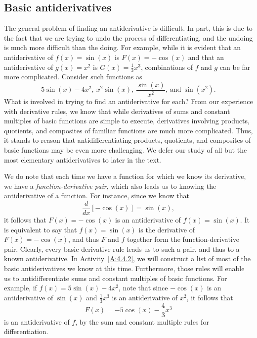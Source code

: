 

\subsection*{Basic antiderivatives}

The general problem of finding an antiderivative is difficult.  In part, this is due to the fact that we are trying to undo the process of differentiating, and the undoing is much more difficult than the doing.  For example, while it is evident that an antiderivative of $f(x) = \sin(x)$ is $F(x) = -\cos(x)$ and that an antiderivative of $g(x) = x^2$ is $G(x) = \frac{1}{3} x^3$, combinations of $f$ and $g$ can be far more complicated.  Consider such functions as
$$5\sin(x) - 4x^2, \ x^2 \sin(x), \ \frac{\sin(x)}{x^2}, \ \mbox{and} \ \sin(x^2).$$
What is involved in trying to find an antiderivative for each?  From our experience with derivative rules, we know that while derivatives of sums and constant multiples of  basic functions are simple to execute, derivatives involving products, quotients, and composites of familiar functions are much more complicated.  Thus, it stands to reason that antidifferentiating products, quotients, and composites of basic functions may be even more challenging.  We defer our study of all but the most elementary antiderivatives to later in the text.

We do note that each time we have a function for which we know its derivative, we have a \emph{function-derivative pair}, which also leads us to knowing the antiderivative of a function.  For instance, since we know that 
$$\frac{d}{dx}[-\cos(x)] = \sin(x),$$
it follows that $F(x) = -\cos(x)$ is an antiderivative of $f(x) = \sin(x)$.  It is equivalent to say that $f(x) = \sin(x)$ is the derivative of $F(x) = -\cos(x)$, and thus $F$ and $f$ together form the function-derivative pair.  Clearly, every basic derivative rule leads us to such a pair, and thus to a known antiderivative.   In Activity~\ref{A:4.4.2}, we will construct a list of most of the basic antiderivatives we know at this time.  Furthermore, those rules will enable us to antidifferentiate sums and constant multiples of basic functions.  For example, if $f(x) = 5\sin(x) - 4x^2$, note that since $-\cos(x)$ is an antiderivative of $\sin(x)$ and $\frac{1}{3}x^3$ is an antiderivative of $x^2$, it follows that 
$$F(x) = -5\cos(x) - \frac{4}{3}x^3$$
is an antiderivative of $f$, by the sum and constant multiple rules for differentiation.

